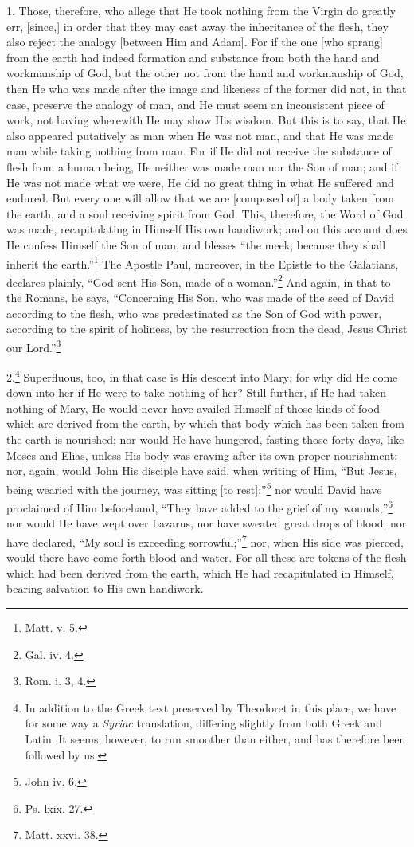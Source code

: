 1. Those, therefore, who allege that He took nothing from the Virgin do greatly err, [since,] in order that they may cast away the inheritance of the flesh, they also reject the analogy [between Him and Adam]. For if the one [who sprang] from the earth had indeed formation and substance from both the hand and workmanship of God, but the other not from the hand and workmanship of God, then He who was made after the image and likeness of the former did not, in that case, preserve the analogy of man, and He must seem an inconsistent piece of work, not having wherewith He may show His wisdom. But this is to say, that He also appeared putatively as man when He was not man, and that He was made man while taking nothing from man. For if He did not receive the substance of flesh from a human being, He neither was made man nor the Son of man; and if He was not made what we were, He did no great thing in what He suffered and endured. But every one will allow that we are [composed of] a body taken from the earth, and a soul receiving spirit from God. This, therefore, the Word of God was made, recapitulating in Himself His own handiwork; and on this account does He confess Himself the Son of man, and blesses “the meek, because they shall inherit the earth.”\footnote{Matt. v. 5.} The Apostle Paul, moreover, in the Epistle to the Galatians, declares plainly, “God sent His Son, made of a woman.”\footnote{Gal. iv. 4.} And again, in that to the Romans, he says, “Concerning His Son, who was made of the seed of David according to the flesh, who was predestinated as the Son of God with power, according to the spirit of holiness, by the resurrection from the dead, Jesus Christ our Lord.”\footnote{Rom. i. 3, 4.}

2.\footnote{In addition to the Greek text preserved by Theodoret in this place, we have for some way a \emph{Syriac} translation, differing slightly from both Greek and Latin. It seems, however, to run smoother than either, and has therefore been followed by us.} Superfluous, too, in that case is His descent into Mary; for why did He come down into her if He were to take nothing of her? Still further, if He had taken nothing of Mary, He would never have availed Himself of those kinds of food which are derived from the earth, by which that body which has been taken from the earth is nourished; nor would He have hungered, fasting those forty days, like Moses and Elias, unless His body was craving after its own proper nourishment; nor, again, would John His disciple have said, when writing of Him, “But Jesus, being wearied with the journey, was sitting [to rest];”\footnote{John iv. 6.} nor would David have proclaimed of Him beforehand, “They have added to the grief of my wounds;”\footnote{Ps. lxix. 27.} nor would He have wept over Lazarus, nor have sweated great drops of blood; nor have declared, “My soul is exceeding sorrowful;”\footnote{Matt. xxvi. 38.} nor, when His side was pierced, would there  have come forth blood and water. For all these are tokens of the flesh which had been derived from the earth, which He had recapitulated in Himself, bearing salvation to His own handiwork.

